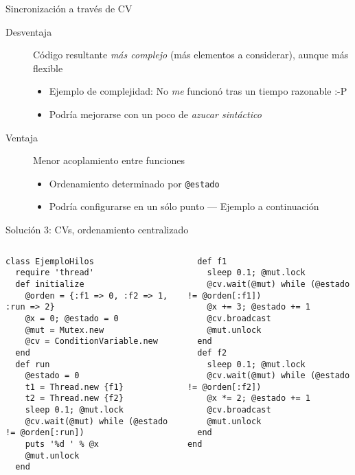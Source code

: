 \documentclass[presentation]{beamer}
\begin{document}
\begin{frame}[label={sec:org88d94a5},fragile]{Sincronización a través de CV}
 \begin{description}
\item[{Desventaja}] Código resultante \emph{más complejo} (más elementos a
considerar), aunque más flexible
\begin{itemize}
\item Ejemplo de complejidad: No \emph{me} funcionó tras un tiempo
razonable :-P
\item Podría mejorarse con un poco de \emph{azucar sintáctico}
\end{itemize}
\item[{Ventaja}] Menor acoplamiento entre funciones
\begin{itemize}
\item Ordenamiento determinado por \texttt{@estado}
\item Podría configurarse en un sólo punto — Ejemplo a continuación
\end{itemize}
\end{description}
\end{frame}
\begin{frame}[label={sec:orgef31960},fragile]{Solución 3: CVs, ordenamiento centralizado}
 \begin{columns}\begin{column}{0.5\textwidth}
\begin{verbatim}
class EjemploHilos
  require 'thread'
  def initialize
    @orden = {:f1 => 0, :f2 => 1, :run => 2}
    @x = 0; @estado = 0
    @mut = Mutex.new
    @cv = ConditionVariable.new
  end
  def run
    @estado = 0
    t1 = Thread.new {f1}
    t2 = Thread.new {f2}
    sleep 0.1; @mut.lock
    @cv.wait(@mut) while (@estado != @orden[:run])
    puts '%d ' % @x
    @mut.unlock
  end
\end{verbatim}
\end{column} \begin{column}{0.5\textwidth}
\begin{verbatim}
  def f1
    sleep 0.1; @mut.lock
    @cv.wait(@mut) while (@estado != @orden[:f1])
    @x += 3; @estado += 1
    @cv.broadcast
    @mut.unlock
  end
  def f2
    sleep 0.1; @mut.lock
    @cv.wait(@mut) while (@estado != @orden[:f2])
    @x *= 2; @estado += 1
    @cv.broadcast
    @mut.unlock
  end
end
\end{verbatim}
\end{column}\end{columns}
\end{frame}
\end{document}
